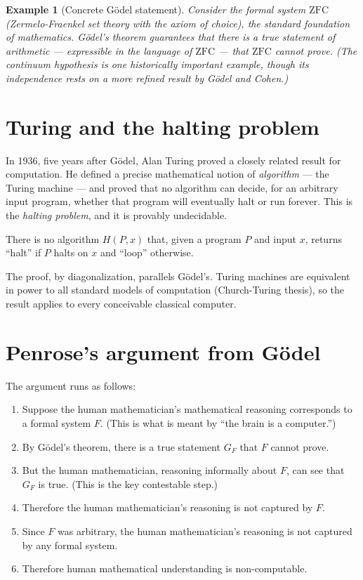 \documentclass[11pt,a4paper]{book}
\theoremstyle{cleanrm}
\newtheorem{example}{Example}[chapter]
\begin{document}
\begin{example}[Concrete G\"odel statement]
Consider the formal system $\text{ZFC}$ (Zermelo-Fraenkel set theory
with the axiom of choice), the standard foundation of mathematics.
G\"odel's theorem guarantees that there is a true statement of
arithmetic --- expressible in the language of $\text{ZFC}$ --- that
$\text{ZFC}$ cannot prove. (The continuum hypothesis is one historically
important example, though its independence rests on a more refined
result by G\"odel and Cohen.)
\end{example}

\section{Turing and the halting problem}

In 1936, five years after G\"odel, Alan Turing proved a closely
related result for computation. He defined a precise mathematical
notion of \emph{algorithm} --- the Turing machine --- and proved that
no algorithm can decide, for an arbitrary input program, whether that
program will eventually halt or run forever. This is the
\emph{halting problem}, and it is provably undecidable.

\begin{conceptbox}
There is no algorithm $H(P, x)$ that, given a program $P$ and input
$x$, returns ``halt'' if $P$ halts on $x$ and ``loop'' otherwise.
\end{conceptbox}

The proof, by diagonalization, parallels G\"odel's. Turing machines
are equivalent in power to all standard models of computation
(Church-Turing thesis), so the result applies to every conceivable
classical computer.

\section{Penrose's argument from G\"odel}

The argument runs as follows:

\begin{enumerate}[leftmargin=2em]
    \item Suppose the human mathematician's mathematical reasoning
    corresponds to a formal system $F$. (This is what is meant by
    ``the brain is a computer.'')
    \item By G\"odel's theorem, there is a true statement $G_F$ that
    $F$ cannot prove.
    \item But the human mathematician, reasoning informally about
    $F$, can see that $G_F$ is true. (This is the key contestable
    step.)
    \item Therefore the human mathematician's reasoning is not
    captured by $F$.
    \item Since $F$ was arbitrary, the human mathematician's
    reasoning is not captured by any formal system.
    \item Therefore human mathematical understanding is non-computable.
\end{enumerate}
\end{document}
